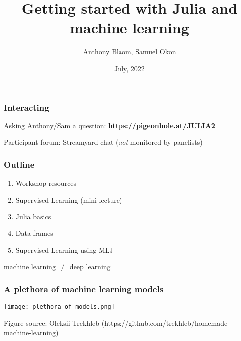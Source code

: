 \documentclass[t]{beamer}
\title{\color{Maroon} Getting started with Julia and machine learning}
\date{July, 2022}
\author{Anthony Blaom, Samuel Okon}
\newcommand\df{\bf\color{Maroon}}
\begin{document}



\begin{frame}
        \titlepage
\end{frame}

\begin{frame}
  \frametitle{Interacting}
  
  \begin{block}{Asking Anthony/Sam a question:}
    {\df\ttfamily https://pigeonhole.at/JULIA2}
  \end{block}

  \begin{block}{Participant forum:}
    Streamyard chat ({\em not} monitored by panelists)
  \end{block}

\end{frame}

\begin{frame}
  \frametitle{Outline}
  \begin{enumerate}
  \item Workshop resources
  \item Supervised Learning (mini lecture)
  \item Julia basics 
  \item Data frames 
  \item Supervised Learning using MLJ
  \end{enumerate}
\end{frame}

\begin{frame}
  \vspace{5\baselineskip}
  \begin{center}
  {\Large machine learning $\ne$ deep learning\\
  \mbox{}\hspace{4cm} }
  \end{center}
\end{frame}

\begin{frame}
  \frametitle{A plethora of machine learning models}
  \begin{center}
    \texttt{[image: plethora\_of\_models.png]}
  \end{center}
  {\tiny Figure source: Oleksii Trekhleb ({\ttfamily https://github.com/trekhleb/homemade-machine-learning})}
\end{frame}
\end{document}
